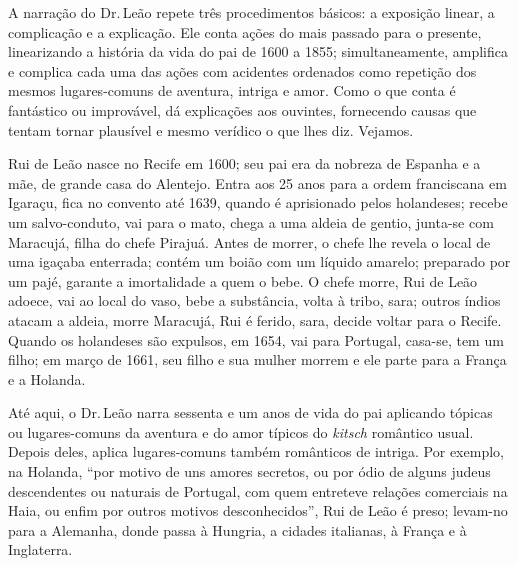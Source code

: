 A narração do Dr.\,Leão repete três procedimentos básicos: a exposição
linear, a complicação e a explicação. Ele conta ações do mais passado
para o presente, linearizando a história da vida do pai de 1600 a 1855;
simultaneamente, amplifica e complica cada uma das ações com acidentes
ordenados como repetição dos mesmos lugares-comuns de aventura, intriga
e amor. Como o que conta é fantástico ou improvável, dá explicações aos
ouvintes, fornecendo causas que tentam tornar plausível e mesmo verídico
o que lhes diz. Vejamos.

Rui de Leão nasce no Recife em 1600; seu pai era da nobreza de Espanha e
a mãe, de grande casa do Alentejo. Entra aos 25 anos para a ordem
franciscana em Igaraçu, fica no convento até 1639, quando é aprisionado
pelos holandeses; recebe um salvo-conduto, vai para o mato, chega a uma
aldeia de gentio, junta-se com Maracujá, filha do chefe Pirajuá. Antes
de morrer, o chefe lhe revela o local de uma igaçaba enterrada; contém
um boião com um líquido amarelo; preparado por um pajé, garante a
imortalidade a quem o bebe. O chefe morre, Rui de Leão adoece, vai ao
local do vaso, bebe a substância, volta à tribo, sara; outros índios
atacam a aldeia, morre Maracujá, Rui é ferido, sara, decide voltar para
o Recife. Quando os holandeses são expulsos, em 1654, vai para Portugal,
casa-se, tem um filho; em março de 1661, seu filho e sua mulher morrem e
ele parte para a França e a Holanda.

Até aqui, o Dr.\,Leão narra sessenta e um anos de vida do pai aplicando
tópicas ou lugares-comuns da aventura e do amor típicos do \emph{kitsch}
romântico usual. Depois deles, aplica lugares-comuns também românticos
de intriga. Por exemplo, na Holanda, ``por motivo de uns amores secretos,
ou por ódio de alguns judeus descendentes ou naturais de Portugal, com
quem entreteve relações comerciais na Haia, ou enfim por outros motivos
desconhecidos'', Rui de Leão é preso; levam-no para a Alemanha, donde
passa à Hungria, a cidades italianas, à França e à Inglaterra.

